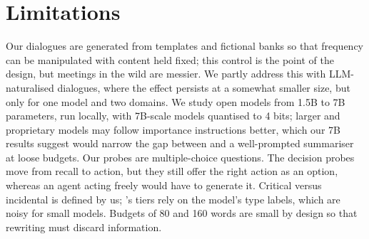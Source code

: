 \section*{Limitations}

Our dialogues are generated from templates and fictional banks so that frequency can be manipulated with content held fixed; this control is the point of the design, but meetings in the wild are messier. We partly address this with LLM-naturalised dialogues, where the effect persists at a somewhat smaller size, but only for one model and two domains.
We study open models from 1.5B to 7B parameters, run locally, with 7B-scale models quantised to 4 bits; larger and proprietary models may follow importance instructions better, which our 7B results suggest would narrow the gap between \ledger{} and a well-prompted summariser at loose budgets.
Our probes are multiple-choice questions. The decision probes move from recall to action, but they still offer the right action as an option, whereas an agent acting freely would have to generate it.
Critical versus incidental is defined by us; \ledger{}'s tiers rely on the model's type labels, which are noisy for small models.
Budgets of 80 and 160 words are small by design so that rewriting must discard information.
